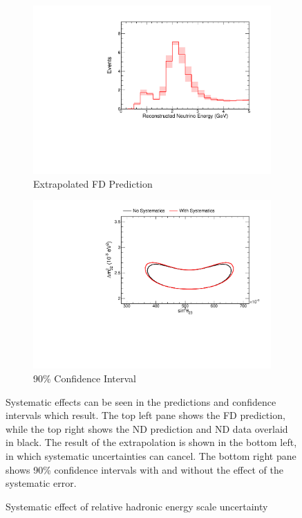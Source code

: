 {\begin{figure}
\begin{center}
\begin{subfigure}[c]{0.49\textwidth}
\includegraphics[width=\textwidth]{figures/systs/prediction/fd_extrap_prediction_hadERel.pdf}
\caption*{Extrapolated FD Prediction}
\end{subfigure}
\begin{subfigure}[c]{0.49\textwidth}
\includegraphics[width=\textwidth]{figures/systs/prediction/fd_extrap_contour_hadERel.pdf}
\caption*{90\% Confidence Interval}
\end{subfigure}
\end{center}
\caption{Systematic effect of relative hadronic energy scale uncertainty}{
Systematic effects can be seen in the predictions and confidence intervals
which result.
The top left pane shows the FD prediction, while the top right shows the
ND prediction and ND data overlaid in black.
The result of the extrapolation is shown in the bottom left, in which
systematic uncertainties can cancel.
The bottom right pane shows 90\% confidence intervals with and without
the effect of the systematic error.}
\label{syst_fig_hadERel}


\end{figure}}
